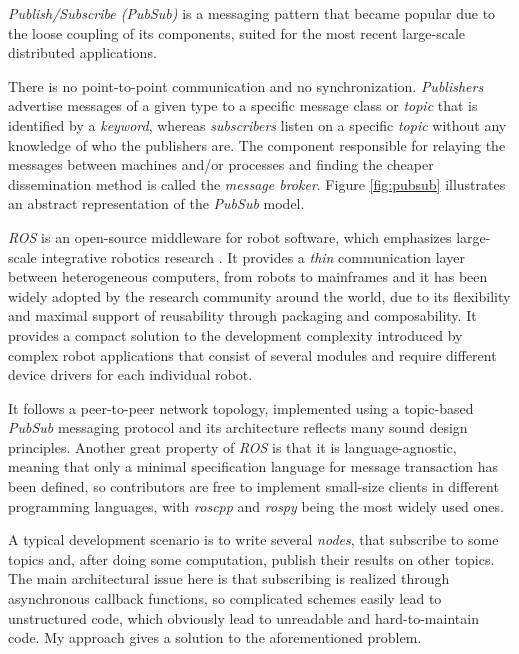 \documentclass{dithesis}
\begin{document}

\textit{Publish/Subscribe (PubSub)} is a messaging pattern that became popular due to the loose coupling of its components, suited for the most recent large-scale distributed applications.

There is no point-to-point communication and no synchronization. \textit{Publishers} advertise messages of a given type to a specific message class or \textit{topic} that is identified by a \textit{keyword}, whereas \textit{subscribers} listen on a specific \textit{topic} without any knowledge of who the publishers are. The component responsible for relaying the messages between machines and/or processes and finding the cheaper dissemination method is called the \textit{message broker}. Figure \ref{fig:pubsub} illustrates an abstract representation of the \textit{PubSub} model.



\textit{ROS} is an open-source middleware for robot software, which emphasizes large-scale integrative robotics research \cite{ROS}. It provides a \textit{thin} communication layer between heterogeneous computers, from robots to mainframes and it has been widely adopted by the research community around the world, due to its flexibility and maximal support of reusability through packaging and composability. It provides a compact solution to the development complexity introduced by complex robot applications that consist of several modules and require different device drivers for each individual robot. 

It follows a peer-to-peer network topology, implemented using a topic-based \textit{PubSub} messaging protocol and its architecture reflects many sound design principles. Another great property of \textit{ROS} is that it is language-agnostic, meaning that only a minimal specification language for message transaction has been defined, so contributors are free to implement small-size clients in different programming languages, with \textit{roscpp} and \textit{rospy} being the most widely used ones.

A typical development scenario is to write several \textit{nodes}, that subscribe to some topics and, after doing some computation, publish their results on other topics. The main architectural issue here is that subscribing is realized through asynchronous callback functions, so complicated schemes easily lead to unstructured code, which obviously lead to unreadable and hard-to-maintain code. My approach gives a solution to the aforementioned problem.
 
\end{document}
